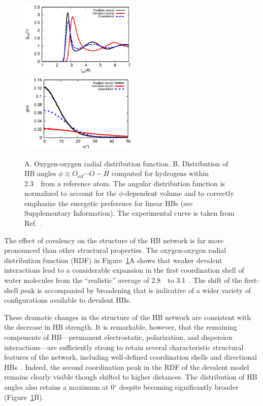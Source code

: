 \documentclass[aps,prl,reprint,amsmath,amssymb]{revtex4-1}
\begin{document}
\begin{figure}
\includegraphics[width=0.5\textwidth]{new_rdf}
\includegraphics[width=0.5\textwidth]{new_adf}
\caption{A. Oxygen-oxygen radial distribution function. B. Distribution of HB angles $\phi \equiv O_{\text{ref}} \cdots O-H$ computed for hydrogens within 2.3~\Ang\ from a reference atom. The angular distribution function is normalized to account for the $\phi$-dependent volume and to correctly emphasize the energetic preference for linear HBs (see Supplementary Information). The experimental curve is taken from Ref.~.} \label{Fig:RDF}
\end{figure}

The effect of covalency on the structure of the HB network is far more pronounced than other structural properties. 
The oxygen-oxygen radial distribution function (RDF) in Figure~\ref{Fig:RDF}A shows that weaker devalent interactions lead to a considerable expansion in the first coordination shell of water molecules from the ``realistic'' average of 2.8~\Ang\ to 3.1~\Ang. 
The shift of the first-shell peak is accompanied by broadening that is indicative of a wider variety of configurations available to devalent HBs.

These dramatic changes in the structure of the HB network are consistent with the decrease in HB strength. 
It is remarkable, however, that the remaining components of HB---permanent electrostatic, polarization, and dispersion interactions---are sufficiently strong to retain several characteristic structural features of the network, including well-defined coordination shells and directional HBs~\cite{arunan2011definition}.
Indeed, the second coordination peak in the RDF of the devalent model remains clearly visible though shifted to higher distances. 
The distribution of HB angles also retains a maximum at 0$^\circ$ despite becoming significantly broader (Figure~\ref{Fig:RDF}B).
\end{document}
